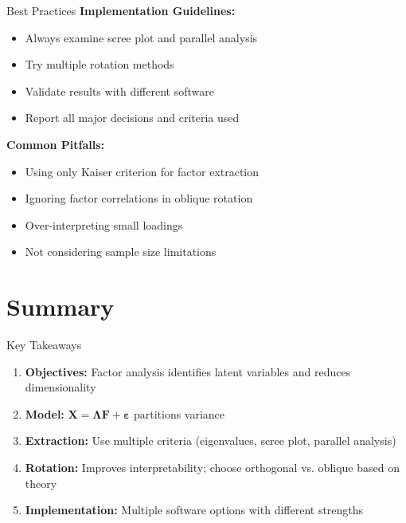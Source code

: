 \documentclass[aspectratio=169]{beamer}
\begin{document}
\begin{frame}{Best Practices}
  \textbf{Implementation Guidelines:}
  \begin{itemize}
    \item Always examine scree plot and parallel analysis
    \item Try multiple rotation methods
    \item Validate results with different software
    \item Report all major decisions and criteria used
  \end{itemize}
  
  \textbf{Common Pitfalls:}
  \begin{itemize}
    \item Using only Kaiser criterion for factor extraction
    \item Ignoring factor correlations in oblique rotation
    \item Over-interpreting small loadings
    \item Not considering sample size limitations
  \end{itemize}
\end{frame}


\section{Summary}
\begin{frame}
  \sectionpage
\end{frame}

\begin{frame}{Key Takeaways}
  \begin{enumerate}
    \item \textbf{Objectives:} Factor analysis identifies latent variables and reduces dimensionality
    \item \textbf{Model:} $\mathbf{X} = \boldsymbol{\Lambda}\mathbf{F} + \boldsymbol{\varepsilon}$ partitions variance
    \item \textbf{Extraction:} Use multiple criteria (eigenvalues, scree plot, parallel analysis)
    \item \textbf{Rotation:} Improves interpretability; choose orthogonal vs. oblique based on theory
    \item \textbf{Implementation:} Multiple software options with different strengths
  \end{enumerate}
\end{frame}
\end{document}
